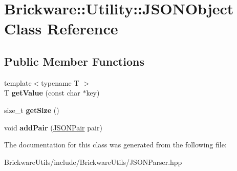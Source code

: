 \hypertarget{classBrickware_1_1Utility_1_1JSONObject}{}\section{Brickware\+:\+:Utility\+:\+:J\+S\+O\+N\+Object Class Reference}
\label{classBrickware_1_1Utility_1_1JSONObject}
\subsection*{Public Member Functions}
\begin{DoxyCompactItemize}
\item 
\hypertarget{classBrickware_1_1Utility_1_1JSONObject_a1f3c294cac1b1b28c9a5f412359a5635}{}{\footnotesize template$<$typename T $>$ }\\T {\bfseries get\+Value} (const char $\ast$key)\label{classBrickware_1_1Utility_1_1JSONObject_a1f3c294cac1b1b28c9a5f412359a5635}

\item 
\hypertarget{classBrickware_1_1Utility_1_1JSONObject_a931fd6b2c90fadabe46e6de3a28e0daf}{}size\+\_\+t {\bfseries get\+Size} ()\label{classBrickware_1_1Utility_1_1JSONObject_a931fd6b2c90fadabe46e6de3a28e0daf}

\item 
\hypertarget{classBrickware_1_1Utility_1_1JSONObject_aacb5eca3194f51f9e345d8fef60ff811}{}void {\bfseries add\+Pair} (\hyperlink{classBrickware_1_1Utility_1_1JSONPair}{J\+S\+O\+N\+Pair} pair)\label{classBrickware_1_1Utility_1_1JSONObject_aacb5eca3194f51f9e345d8fef60ff811}

\end{DoxyCompactItemize}


The documentation for this class was generated from the following file\+:\begin{DoxyCompactItemize}
\item 
Brickware\+Utils/include/\+Brickware\+Utils/J\+S\+O\+N\+Parser.\+hpp\end{DoxyCompactItemize}
